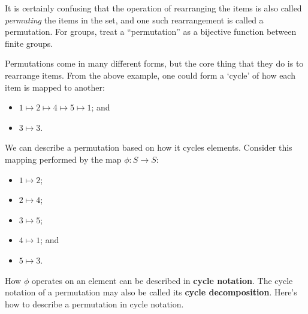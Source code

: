 \begin{remark}
    It is certainly confusing that the operation of rearranging the items is also called \textit{permuting} the items in the set, and one such rearrangement is called a permutation. For groups, treat a ``permutation'' as a bijective function between finite groups.
\end{remark}

Permutations come in many different forms, but the core thing that they do is to rearrange items. From the above example, one could form a `cycle' of how each item is mapped to another:
\begin{itemize}
    \item $1 \mapsto 2 \mapsto 4 \mapsto 5 \mapsto 1$; and
    \item $3 \mapsto 3$.
\end{itemize}
We can describe a permutation based on how it cycles elements. Consider this mapping performed by the map $\phi: S \to S$:
\begin{itemize}
    \item $1 \mapsto 2$;
    \item $2 \mapsto 4$;
    \item $3 \mapsto 5$;
    \item $4 \mapsto 1$; and
    \item $5 \mapsto 3$.
\end{itemize}
How $\phi$ operates on an element can be described in \textbf{cycle notation}. The cycle notation of a permutation may also be called its \textbf{cycle decomposition}. Here's how to describe a permutation in cycle notation.
